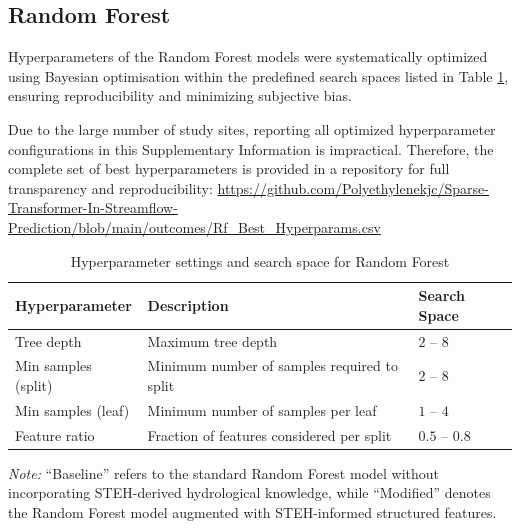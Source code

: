 \documentclass[11pt]{article}
\begin{document}
\subsection{Random Forest}
\label{sec:rfHyper}
Hyperparameters of the Random Forest models were systematically optimized using Bayesian optimisation within the predefined search spaces listed in Table \ref{tab:rf_hyperparameters}\cite{BO_OPT}, ensuring reproducibility and minimizing subjective bias.

Due to the large number of study sites, reporting all optimized hyperparameter configurations in this Supplementary Information is impractical. Therefore, the complete set of best hyperparameters is provided in a repository for full transparency and reproducibility: \href{https://github.com/Polyethylenekjc/Sparse-Transformer-In-Streamflow-Prediction/blob/main/outcomes/Rf\_Best\_Hyperparams.csv}{https://github.com/Polyethylenekjc/Sparse-Transformer-In-Streamflow-Prediction/blob/main/outcomes/Rf\_Best\_Hyperparams.csv}

\begin{table}[htbp]
    \centering
    \caption{Hyperparameter settings and search space for Random Forest}
    \label{tab:rf_hyperparameters}
    \begin{tabular*}{\textwidth}{@{\extracolsep{\fill}}lll}
        \toprule
        \textbf{Hyperparameter} & \textbf{Description} & \textbf{Search Space} \\
        \midrule
        Tree depth & Maximum tree depth & $2$ -- $8$ \\
        Min samples (split) & Minimum number of samples required to split & $2$ -- $8$ \\
        Min samples (leaf) & Minimum number of samples per leaf & $1$ -- $4$ \\
        Feature ratio & Fraction of features considered per split & $0.5$ -- $0.8$ \\
        \bottomrule
    \end{tabular*}

    \vspace{2mm}
    \footnotesize
    \textit{Note:} ``Baseline'' refers to the standard Random Forest model without incorporating STEH-derived hydrological knowledge, while ``Modified'' denotes the Random Forest model augmented with STEH-informed structured features.
\end{table}



\end{document}
